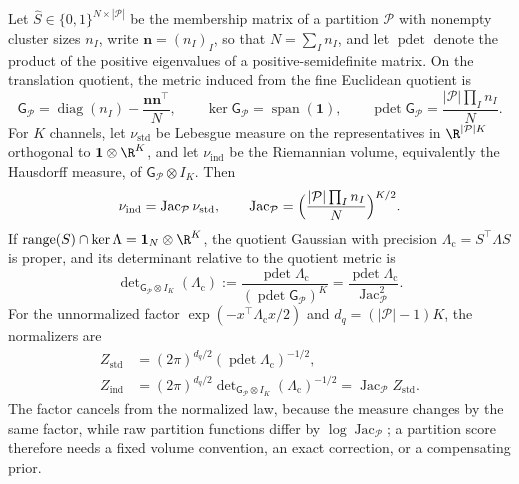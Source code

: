Let \(\widehat S\in\{0,1\}^{N\times|\mathcal P|}\) be the membership matrix of a
partition \(\mathcal P\) with nonempty cluster sizes \(n_I\), write
\(\mathbf n=(n_I)_I\), so that \(N=\sum_In_I\), and let \(\operatorname{pdet}\)
denote the product of the positive eigenvalues of a positive-semidefinite
matrix. On the translation quotient, the metric induced from the fine Euclidean
quotient is
\begin{equation}
\mathsf G_{\mathcal P}=\operatorname{diag}(n_I)-\frac{\mathbf n\mathbf n^\top}{N},\qquad
\ker\mathsf G_{\mathcal P}=\operatorname{span}(\mathbf1),\qquad
\operatorname{pdet}\mathsf G_{\mathcal P}=\frac{|\mathcal P|\prod_In_I}{N}.
\label{eq:cg-quotient-metric}
\end{equation}
For \(K\) channels, let \(\nu_{\mathrm{std}}\) be Lebesgue measure on the
representatives in \(\R^{|\mathcal P|K}\) orthogonal to
\(\mathbf1\otimes\R^K\), and let \(\nu_{\mathrm{ind}}\) be the Riemannian volume,
equivalently the Hausdorff measure, of \(\mathsf G_{\mathcal P}\otimes I_K\).
Then
\begin{equation}
\nu_{\mathrm{ind}}=\operatorname{Jac}_{\mathcal P}\nu_{\mathrm{std}},\qquad
\operatorname{Jac}_{\mathcal P}
=\Bigl(\frac{|\mathcal P|\prod_In_I}{N}\Bigr)^{K/2}.
\label{eq:cg-quotient-jacobian}
\end{equation}
If \(\operatorname{range}(S)\cap\ker\Lambda=\mathbf1_N\otimes\R^K\), the quotient
Gaussian with precision \(\Lambda_{\mathrm c}=S^\top\Lambda S\) is proper, and its
determinant relative to the quotient metric is
\begin{equation}
\det\nolimits_{\mathsf G_{\mathcal P}\otimes I_K}(\Lambda_{\mathrm c})
:=\frac{\operatorname{pdet}\Lambda_{\mathrm c}}
{(\operatorname{pdet}\mathsf G_{\mathcal P})^K}
=\frac{\operatorname{pdet}\Lambda_{\mathrm c}}{\operatorname{Jac}_{\mathcal P}^2}.
\label{eq:cg-quotient-generalized-determinant}
\end{equation}
For the unnormalized factor \(\exp(-x^\top\Lambda_{\mathrm c}x/2)\) and
\(d_q=(|\mathcal P|-1)K\), the normalizers are
\begin{equation}
\begin{aligned}
Z_{\mathrm{std}}
&=(2\pi)^{d_q/2}
(\operatorname{pdet}\Lambda_{\mathrm c})^{-1/2},\\
Z_{\mathrm{ind}}
&=(2\pi)^{d_q/2}
\det\nolimits_{\mathsf G_{\mathcal P}\otimes I_K}(\Lambda_{\mathrm c})^{-1/2}
=\operatorname{Jac}_{\mathcal P}Z_{\mathrm{std}}.
\end{aligned}
\label{eq:cg-quotient-normalizers}
\end{equation}
The factor cancels from the normalized law, because the measure changes by the
same factor, while raw partition functions differ by
\(\log\operatorname{Jac}_{\mathcal P}\); a partition score therefore needs a
fixed volume convention, an exact correction, or a compensating prior.

